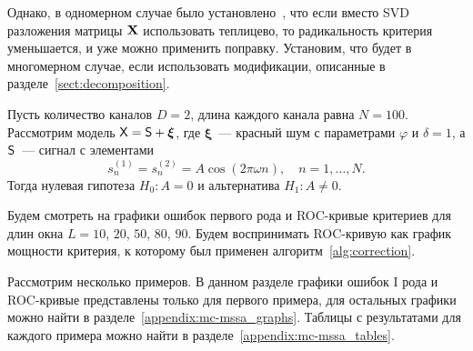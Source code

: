 \documentclass[specialist,
substylefile = spbu.rtx,
               subf,href,colorlinks=true, 12pt]{disser}
\theoremstyle{definition}
\newcommand{\bfxi}{\boldsymbol{\xi}}
\begin{document}
Однако, в одномерном случае было установлено~\cite{Larin2022}, что если вместо SVD разложения матрицы $\mathbf{X}$ использовать теплицево, то радикальность критерия уменьшается, и уже можно применить поправку. Установим, что будет в многомерном случае, если использовать модификации, описанные в разделе~\ref{sect:decomposition}.

Пусть количество каналов $D=2$, длина каждого канала равна $N=100$. Рассмотрим модель $\tX=\tS+\bfxi$, где $\bfxi$~--- красный шум с параметрами $\varphi$ и $\delta=1$, а $\mathsf{S}$~--- сигнал с элементами
\[
s_n^{(1)}=s_n^{(2)}=A\cos(2\pi\omega n),\quad n=1,\ldots, N.
\]
Тогда нулевая гипотеза $H_0:A=0$ и альтернатива $H_1:A\ne0$.

Будем смотреть на графики ошибок первого рода и ROC-кривые критериев для длин окна $L=10$, $20$, $50$, $80$, $90$. Будем воспринимать ROC-кривую как график мощности критерия, к которому был применен алгоритм~\ref{alg:correction}.

Рассмотрим несколько примеров. В данном разделе графики ошибок I рода и ROC-кривые представлены только для первого примера, для остальных графики можно найти в разделе~\ref{appendix:mc-mssa_graphs}. Таблицы с результатами для каждого примера можно найти в разделе~\ref{appendix:mc-mssa_tables}.
\end{document}
